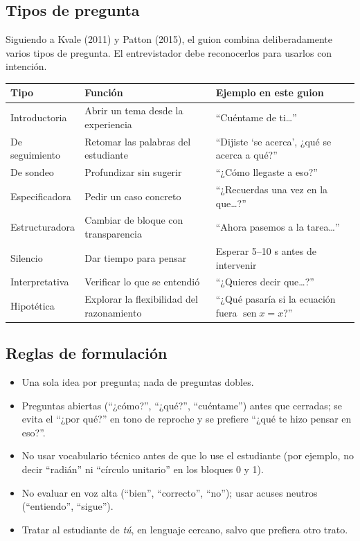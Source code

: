 \documentclass[11pt,letterpaper]{article}
\newcounter{preg}
\begin{document}
\subsection{Tipos de pregunta}
Siguiendo a Kvale (2011) y Patton (2015), el guion combina deliberadamente varios tipos de pregunta. El entrevistador debe reconocerlos para usarlos con intención.

\begin{center}
\small
\begin{tabularx}{\linewidth}{@{}p{3.2cm}Lp{4.6cm}@{}}
\toprule
\textbf{Tipo} & \textbf{Función} & \textbf{Ejemplo en este guion}\\
\midrule
Introductoria & Abrir un tema desde la experiencia & ``Cuéntame de ti\ldots''\\
De seguimiento & Retomar las palabras del estudiante & ``Dijiste `se acerca', ¿qué se acerca a qué?''\\
De sondeo & Profundizar sin sugerir & ``¿Cómo llegaste a eso?''\\
Especificadora & Pedir un caso concreto & ``¿Recuerdas una vez en la que\ldots?''\\
Estructuradora & Cambiar de bloque con transparencia & ``Ahora pasemos a la tarea\ldots''\\
Silencio & Dar tiempo para pensar & Esperar 5--10 s antes de intervenir\\
Interpretativa & Verificar lo que se entendió & ``¿Quieres decir que\ldots?''\\
Hipotética & Explorar la flexibilidad del razonamiento & ``¿Qué pasaría si la ecuación fuera $\operatorname{sen} x = x$?''\\
\bottomrule
\end{tabularx}
\end{center}

\subsection{Reglas de formulación}
\begin{itemize}
  \item Una sola idea por pregunta; nada de preguntas dobles.
  \item Preguntas abiertas (``¿cómo?'', ``¿qué?'', ``cuéntame'') antes que cerradas; se evita el ``¿por qué?'' en tono de reproche y se prefiere ``¿qué te hizo pensar en eso?''.
  \item No usar vocabulario técnico antes de que lo use el estudiante (por ejemplo, no decir ``radián'' ni ``círculo unitario'' en los bloques 0 y 1).
  \item No evaluar en voz alta (``bien'', ``correcto'', ``no''); usar acuses neutros (``entiendo'', ``sigue'').
  \item Tratar al estudiante de \emph{tú}, en lenguaje cercano, salvo que prefiera otro trato.
\end{itemize}
\end{document}
